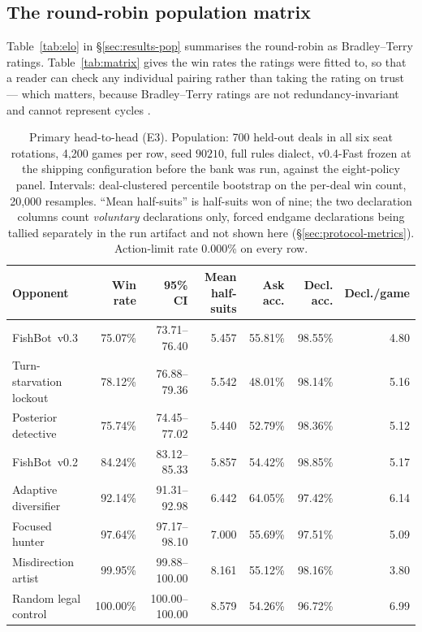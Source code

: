 \documentclass[11pt]{article}
\theoremstyle{definition}
\DeclareRobustCommand{\vfast}{\texorpdfstring{\mbox{v0.4-Fast}}{v0.4-Fast}}
\DeclareRobustCommand{\vthree}{\texorpdfstring{\mbox{FishBot v0.3}}{FishBot v0.3}}
\DeclareRobustCommand{\vtwo}{\texorpdfstring{\mbox{FishBot v0.2}}{FishBot v0.2}}
\newcommand{\numHtHGames}{4{,}200}
\newcommand{\numHtHDeals}{700}
\newcommand{\numLimitRate}{0.000\%}
\newcommand{\numBootstrapDraws}{20{,}000}
\begin{document}
\subsection{The round-robin population matrix}
\label{app:pop-matrix}

Table~\ref{tab:elo} in \S\ref{sec:results-pop} summarises the round-robin as
Bradley--Terry ratings. Table~\ref{tab:matrix} gives the win rates the ratings
were fitted to, so that a reader can check any individual pairing rather than
taking the rating on trust --- which matters, because Bradley--Terry ratings are
not redundancy-invariant and cannot represent cycles \cite{balduzzi-reeval}.

\begin{table}[!htbp]
\centering
\caption{Primary head-to-head (E3). Population: \numHtHDeals{} held-out deals in
all six seat rotations, \numHtHGames{} games per row, seed $90210$, full rules
dialect, \vfast{} frozen at the shipping configuration before the bank was run,
against the eight-policy panel. Intervals: deal-clustered percentile bootstrap on
the per-deal win count, \numBootstrapDraws{} resamples. ``Mean half-suits'' is
half-suits won of nine; the two declaration columns count \emph{voluntary}
declarations only, forced endgame declarations being tallied separately in the
run artifact and not shown here (\S\ref{sec:protocol-metrics}). Action-limit rate
\numLimitRate{} on every row.}
\label{tab:h2h}
\small
\begin{tabular}{lrrrrrr}
\toprule
Opponent & Win rate & 95\% CI & Mean half-suits & Ask acc. & Decl. acc. & Decl./game \\
\midrule
\vthree{} & 75.07\% & 73.71--76.40 & 5.457 & 55.81\% & 98.55\% & 4.80 \\
Turn-starvation lockout & 78.12\% & 76.88--79.36 & 5.542 & 48.01\% & 98.14\% & 5.16 \\
Posterior detective & 75.74\% & 74.45--77.02 & 5.440 & 52.79\% & 98.36\% & 5.12 \\
\vtwo{} & 84.24\% & 83.12--85.33 & 5.857 & 54.42\% & 98.85\% & 5.17 \\
Adaptive diversifier & 92.14\% & 91.31--92.98 & 6.442 & 64.05\% & 97.42\% & 6.14 \\
Focused hunter & 97.64\% & 97.17--98.10 & 7.000 & 55.69\% & 97.51\% & 5.09 \\
Misdirection artist & 99.95\% & 99.88--100.00 & 8.161 & 55.12\% & 98.16\% & 3.80 \\
Random legal control & 100.00\% & 100.00--100.00 & 8.579 & 54.26\% & 96.72\% & 6.99 \\
\bottomrule
\end{tabular}%
\end{table}
\end{document}
